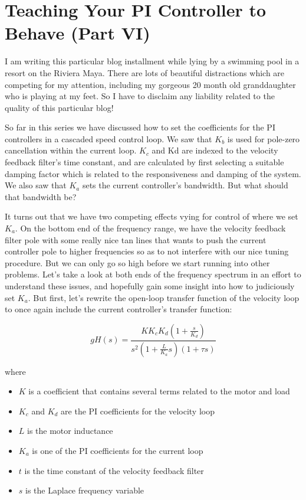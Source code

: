 \chapter{Teaching Your PI Controller to Behave (Part VI)}\label{ch:6}

I am writing this particular blog installment while lying by a swimming pool in a resort on the Riviera Maya.  There are lots of beautiful distractions which are competing for my attention, including my gorgeous 20 month old granddaughter who is playing at my feet.  So I have to disclaim any liability related to the quality of this particular blog!

So far in this series we have discussed how to set the coefficients for the PI controllers in a cascaded speed control loop.  We saw that $K_b$ is used for pole-zero cancellation within the current loop.  $K_c$ and Kd are indexed to the velocity feedback filter’s time constant, and are calculated by first selecting a suitable damping factor which is related to the responsiveness and damping of the system.  We also saw that $K_a$ sets the current controller’s bandwidth.  But what should that bandwidth be?

It turns out that we have two competing effects vying for control of where we set $K_a$.  On the bottom end of the frequency range, we have the velocity feedback filter pole with some really nice tan lines that wants to push the current controller pole to higher frequencies so as to not interfere with our nice tuning procedure.  But we can only go so high before we start running into other problems.  Let’s take a look at both ends of the frequency spectrum in an effort to understand these issues, and hopefully gain some insight into how to judiciously set $K_a$.  But first, let’s rewrite the open-loop transfer function of the velocity loop to once again include the current controller’s transfer function:

\begin{equation}\label{eq:6_1}
    gH(s) = \frac{K K_cK_d \left(1+\frac{s}{K_d}\right)}{s^2 \left(1+\frac{L}{K_a}s\right)\left(1+\tau s\right)}
\end{equation}

where
\begin{itemize}
    \item $K$ is a coefficient that contains several terms related to the motor and load
    \item $K_c$ and $K_d$ are the PI coefficients for the velocity loop
    \item $L$ is the motor inductance
    \item $K_a$ is one of the PI coefficients for the current loop
    \item $t$ is the time constant of the velocity feedback filter
    \item $s$ is the Laplace frequency variable
\end{itemize}

